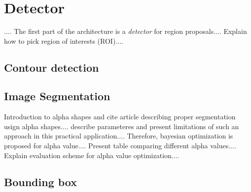 \section{Detector}\label{section:region_proposals}
    \par{
        .... The first part of the architecture is a \emph{detector} for region proposals.... Explain how to pick region of interests (ROI)....
    }
    \subsection{Contour detection}\label{subsection:contour_detection}
    \subsection{Image Segmentation}\label{subsection:segmentation}
        Introduction to alpha shapes and cite article describing proper segmentation usign alpha shapes.... describe parameteres and present limitations of such an approach in this practical application....
        Therefore, bayesian optimization is proposed for alpha value....
        Present table comparing different alpha values....
        Explain evaluation scheme for alpha value optimization....
    \subsection{Bounding box}\label{subsection:bounding_box}



